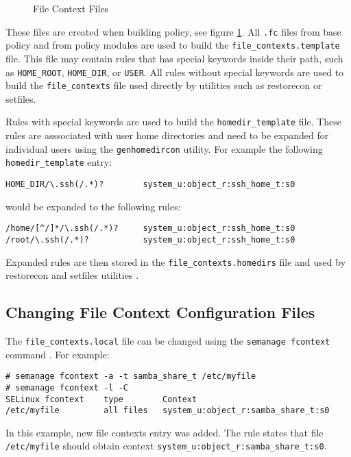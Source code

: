 \begin{figure}
    \centering
    \label{fig:filecontexts}
    
    \caption{File Context Files}
\end{figure}

These files are created when building policy, see figure \ref{fig:filecontexts}.
All \texttt{.fc} files from base policy and from policy modules are used to
build the \texttt{file\_contexts.template} file. This file may contain rules
that has special keywords inside their path, such as \texttt{HOME\_ROOT},
\texttt{HOME\_DIR}, or \texttt{USER}. All rules without special keywords are
used to build the \texttt{file\_contexts} file used directly by utilities such
as restorecon or setfiles.

Rules with special keywords are used to build the \texttt{homedir\_template}
file. These rules are asssociated with user home directories and need to be
expanded for individual users using the \texttt{genhomedircon} utility. For
example the following \texttt{homedir\_template} entry:
\begin{lstlisting}
HOME_DIR/\.ssh(/.*)?        system_u:object_r:ssh_home_t:s0
\end{lstlisting}
would be expanded to the following rules:
\begin{lstlisting}
/home/[^/]*/\.ssh(/.*)?     system_u:object_r:ssh_home_t:s0
/root/\.ssh(/.*)?           system_u:object_r:ssh_home_t:s0
\end{lstlisting}
Expanded rules are then stored in the \texttt{file\_contexts.homedirs} file and
used by restorecon and setfiles utilities \cite[pp.~134--140]{tsn}.

\subsection{Changing File Context Configuration Files}
The \texttt{file\_contexts.local} file can be changed using the \texttt{semanage
fcontext} command \cite{selinuxguide}. For example:
\begin{lstlisting}
# semanage fcontext -a -t samba_share_t /etc/myfile
# semanage fcontext -l -C
SELinux fcontext    type        Context
/etc/myfile         all files   system_u:object_r:samba_share_t:s0
\end{lstlisting}
In this example, new file contexts entry was added. The rule states that file
\texttt{/etc/myfile} should obtain context
\texttt{system\_u:object\_r:samba\_share\_t:s0}.

